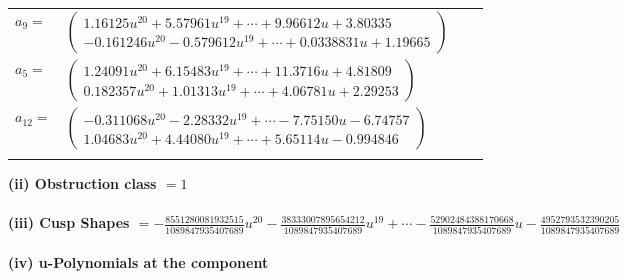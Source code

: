 \documentclass[1p]{elsarticle_modified}
\theoremstyle{definition}
\begin{document}
\begin{tabular}{m{7pt} m{180pt} m{7pt} m{180pt} }
\flushright $a_{9}=$&$\begin{pmatrix}1.16125 u^{20}+5.57961 u^{19}+\cdots+9.96612 u+3.80335\\-0.161246 u^{20}-0.579612 u^{19}+\cdots+0.0338831 u+1.19665\end{pmatrix}$ \\
\flushright $a_{5}=$&$\begin{pmatrix}1.24091 u^{20}+6.15483 u^{19}+\cdots+11.3716 u+4.81809\\0.182357 u^{20}+1.01313 u^{19}+\cdots+4.06781 u+2.29253\end{pmatrix}$ \\
\flushright $a_{12}=$&$\begin{pmatrix}-0.311068 u^{20}-2.28332 u^{19}+\cdots-7.75150 u-6.74757\\1.04683 u^{20}+4.44080 u^{19}+\cdots+5.65114 u-0.994846\end{pmatrix}$\\&\end{tabular}
\flushleft \textbf{(ii) Obstruction class $= 1$}\\~\\
\flushleft \textbf{(iii) Cusp Shapes $= -\frac{8551280081932515}{1089847935407689} u^{20}-\frac{38333007895654212}{1089847935407689} u^{19}+\cdots-\frac{52902484388170668}{1089847935407689} u-\frac{4952793532390205}{1089847935407689}$}\\~\\
\newpage\renewcommand{\arraystretch}{1}
\flushleft \textbf{(iv) u-Polynomials at the component}\newline \\
\end{document}

